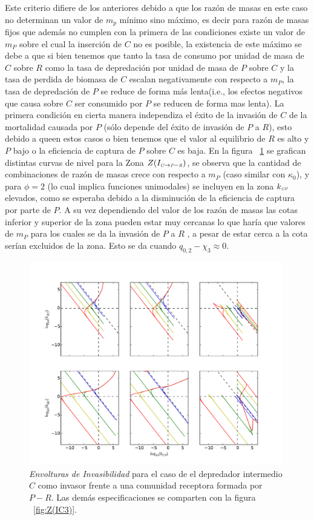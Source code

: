Este criterio difiere de los anteriores debido a que los raz\'on de masas en este caso no determinan un valor de $m_p$ m\'inimo sino m\'aximo, es decir para raz\'on de masas fijos que adem\'as no cumplen con la primera de las condiciones existe un valor de $m_P$ sobre el cual la inserci\'on de $C$ no es posible, la existencia de este m\'aximo se debe a que si bien tenemos que tanto la tasa de consumo por unidad de masa de $C$ sobre $R$ como la tasa de depredaci\'on por unidad de masa de $P$ sobre $C$ y la tasa de perdida de biomasa de $C$ escalan negativamente con respecto a $m_P$, la tasa de depredaci\'on de $P$ se reduce de forma m\'as lenta(i.e., los efectos negativos que causa sobre $C$ ser consumido por $P$ se reducen de forma mas lenta). La primera condici\'on en cierta manera independiza el \'exito de la invasi\'on de $C$ de la mortalidad causada por $P$ (s\'olo depende del \'exito de invasi\'on de $P$ a $R$), esto debido a queen estos casos o bien tenemos que el valor al equilibrio de $R$ es alto y $P$ bajo o la eficiencia de captura de $P$ sobre $C$ es baja. En la figura ~\ref{fig:Z(IC5)} se grafican distintas curvas de nivel para la Zona $Z(I_{\textit{\tiny C} \to \textit{\tiny P}-\textit{\tiny R}})$, se observa que la cantidad de combinaciones de raz\'on de masas crece con respecto a $m_P$ (caso similar con $\kappa_0$), y para $\phi = 2$ (lo cual implica funciones unimodales) se incluyen en la zona $k_{\textit{\tiny CP}}$ elevados, como se esperaba debido a la disminuci\'on de la eficiencia de captura por parte de $P$. A su vez dependiendo del valor de los raz\'on de masas las cotas inferior y superior de la zona pueden estar muy cercanas lo que har\'ia que valores de $m_P$ para los cuales se da la invasi\'on de $P$ a $R$ , a pesar de estar cerca a la cota ser\'ian excluidos de la zona. Esto se da cuando $ q_{0,2} - \chi_3 \approx 0$.


\begin{figure}[!htbp]
  \centering
  \includegraphics[width = 0.99\textwidth]{./Plots/Z(IC5)AcGrGr.pdf}
  \caption[Env $Z(IC5)$]{\emph{Envolturas de Invasibilidad} para el caso de el depredador intermedio $C$ como invasor frente a una comunidad receptora formada por $P-R$. Las dem\'as especificaciones se comparten con la figura ~\ref{fig:Z(IC3)}.}
  \label{fig:Z(IC5)}
\end{figure}

